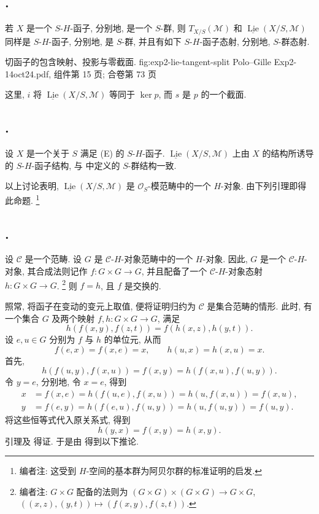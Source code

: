 \subsection*{.}
若 \(X\) 是一个 \(S\)-\(H\)-函子, 分别地, 是一个 \(S\)-群,
则 \(T_{X/S}(\mathcal M)\) 和
\(\underline{\operatorname{Lie}}(X/S,\mathcal M)\)
同样是 \(S\)-\(H\)-函子, 分别地, 是 \(S\)-群,
并且有如下 \(S\)-\(H\)-函子态射, 分别地, \(S\)-群态射.

  {切函子的包含映射、投影与零截面.}
  {fig:exp2-lie-tangent-split}
  {Polo--Gille Exp2-14oct24.pdf, 组件第 15 页; 合卷第 73 页}

这里, \(i\) 将 \(\underline{\operatorname{Lie}}(X/S,\mathcal M)\)
等同于 \(\ker p\), 而 \(s\) 是 \(p\) 的一个截面.

\subsection*{.}
设 \(X\) 是一个关于 \(S\) 满足 (E) 的 \(S\)-\(H\)-函子.
\(\underline{\operatorname{Lie}}(X/S,\mathcal M)\) 上由 \(X\)
的结构所诱导的 \(S\)-\(H\)-函子结构,
与  中定义的 \(S\)-群结构一致.

以上讨论表明, \(\underline{\operatorname{Lie}}(X/S,\mathcal M)\)
是 \(\mathcal O_S\)-模范畴中的一个 \(H\)-对象.
由下列引理即得此命题.
\footnote{编者注: 这受到 \(H\)-空间的基本群为阿贝尔群的标准证明的启发.}

\subsection*{.}
设 \(\mathscr C\) 是一个范畴.
设 \(G\) 是 \(\mathscr C\)-\(H\)-对象范畴中的一个 \(H\)-对象.
因此, \(G\) 是一个 \(\mathscr C\)-\(H\)-对象,
其合成法则记作 \(f:G\times G\to G\),
并且配备了一个 \(\mathscr C\)-\(H\)-对象态射 \(h:G\times G\to G\).
\footnote{编者注: \(G\times G\) 配备的法则为
\((G\times G)\times(G\times G)\to G\times G\),
\(((x,z),(y,t))\mapsto(f(x,y),f(z,t))\).}
则 \(f=h\), 且 \(f\) 是交换的.

照常, 将函子在变动的变元上取值, 便将证明归约为
\(\mathscr C\) 是集合范畴的情形.
此时, 有一个集合 \(G\) 及两个映射 \(f,h:G\times G\to G\), 满足
\[
  h(f(x,y),f(z,t))=f(h(x,z),h(y,t)).
\]
设 \(e,u\in G\) 分别为 \(f\) 与 \(h\) 的单位元, 从而
\[
  f(e,x)=f(x,e)=x,
  \qquad h(u,x)=h(x,u)=x.
\]
首先,
\[
  h(f(u,y),f(x,u))=f(x,y)=h(f(x,u),f(u,y)).
\]
令 \(y=e\), 分别地, 令 \(x=e\), 得到
\begin{align*}
  x&=f(x,e)=h(f(u,e),f(x,u))=h(u,f(x,u))=f(x,u),\\
  y&=f(e,y)=h(f(e,u),f(u,y))=h(u,f(u,y))=f(u,y).
\end{align*}
将这些恒等式代入原关系式, 得到
\[
  h(y,x)=f(x,y)=h(x,y).
\]
引理及 得证.
于是由  得到以下推论.

